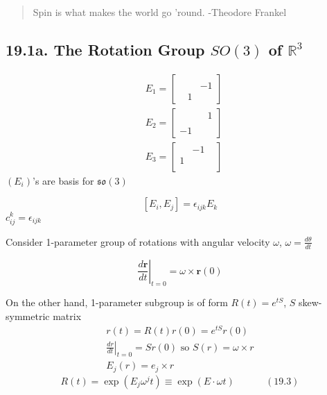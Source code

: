 
\begin{quote}
Spin is what makes the world go 'round. -Theodore Frankel
\end{quote}

\subsection{19.1a. The Rotation Group $SO(3)$ of $\mathbb{R}^3$}

\[
\begin{aligned}
  & E_1 = \left[ \begin{matrix} & & \\ 
       & & -1 \\
      & 1 & \end{matrix} \right] \\
  & E_2 = \left[ \begin{matrix} & & 1 \\ 
       & &  \\
     -1  &  & \end{matrix} \right] \\
& E_3 = \left[ \begin{matrix} & -1 & \\ 
     1  & &  \\
      &  & \end{matrix} \right] 
\end{aligned}
\]
$(E_i)$'s are basis for $\mathfrak{so}(3)$

\[
[E_i,E_j] = \epsilon_{ijk}E_k
\]
$c_{ij}^k = \epsilon_{ijk}$

Consider 1-parameter group of rotations with angular velocity $\omega$, $\omega = \frac{d\theta}{dt}$

\[
\left. \frac{d \mathbf{r}}{dt} \right|_{t=0} = \omega \times \mathbf{r}(0)
\]

On the other hand, 1-parameter subgroup is of form $R(t) = e^{tS}$, $S$ skew-symmetric matrix
\[
\begin{gathered}
  r(t) = R(t)r(0) = e^{tS}r(0) \\ 
  \left. \frac{dr}{dt} \right|_{t=0} = Sr(0) \text{ so } S(r) = \omega \times r \\ 
 E_j(r) = e_j \times r
\end{gathered}
\]
\begin{equation}
R(t) = \exp{ (E_j \omega^jt)} \equiv \exp{ (E\cdot \omega t)} \quad \quad \quad \, (19.3) 
\end{equation}

